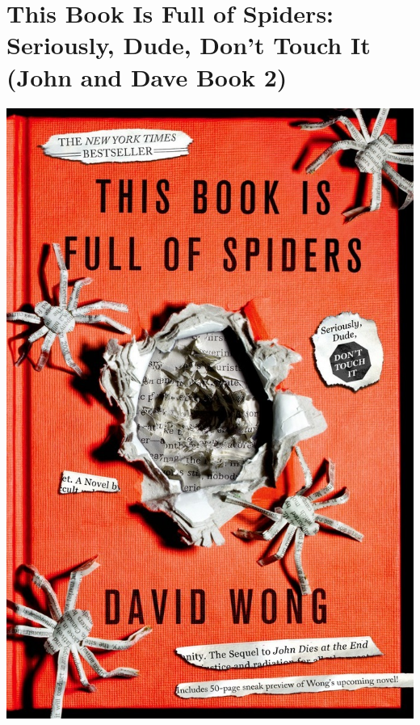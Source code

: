 \documentclass{tufte-handout}
\makeatletter
\newcommand{\varcaption}[2][0pt]{%
  \gsetlength{\@tufte@caption@vertical@offset}{-#1}%
  \gdef\@tufte@stored@varcaption{#2}%
}
\gdef\@tufte@stored@varcaption{} %
\makeatother
\begin{document}
\section*{This Book Is Full of Spiders: Seriously, Dude, Don't Touch It (John and Dave Book 2)}
\begin{marginfigure}[12\baselineskip]
   \includegraphics[width=\linewidth]{images/this_book_is_full_of_spiders.jpg}
   \varcaption{\href{https://us.macmillan.com/books/9781250036650}{Publisher Link}, \href{https://www.amazon.com/gp/product/1250036658/}{Amazon Link}}
\end{marginfigure}
\end{document}

